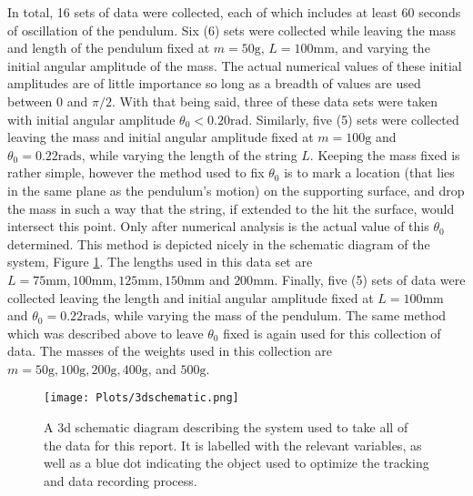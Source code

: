 In total, 16 sets of data were collected, each of which includes at least 60 seconds of oscillation of the pendulum. Six (6) sets were collected while leaving the mass and length of the pendulum fixed at $m = 50\text{g}$, $L = 100\text{mm}$, and varying the initial angular amplitude of the mass. The actual numerical values of these initial amplitudes are of little importance so long as a breadth of values are used between $0$ and $\pi/2$. With that being said, three of these data sets were taken with initial angular amplitude $\theta_0 < 0.20\text{rad}$.  Similarly, five (5) sets were collected leaving the mass and initial angular amplitude fixed at $m = 100\text{g}$ and $\theta_0 = 0.22\text{rads}$, while varying the length of the string $L$. Keeping the mass fixed is rather simple, however the method used to fix $\theta_0$ is to mark a location (that lies in the same plane as the pendulum's motion) on the supporting surface, and drop the mass in such a way that the string, if extended to the hit the surface, would intersect this point. Only after numerical analysis is the actual value of this $\theta_0$ determined. This method is depicted nicely in the schematic diagram of the system, Figure \ref{3dschematic}. The lengths used in this data set are $L = 75\text{mm}, 100\text{mm}, 125\text{mm}, 150\text{mm}$ and $200\text{mm}$. Finally, five (5) sets of data were collected leaving the length and initial angular amplitude fixed at $L = 100\text{mm}$ and $\theta_0 = 0.22\text{rads}$, while varying the mass of the pendulum. The same method which was described above to leave $\theta_0$ fixed is again used for this collection of data. The masses of the weights used in this collection are $m = 50\text{g}, 100\text{g}, 200\text{g}, 400\text{g}$, and $500\text{g}$.\\[0.20cm]

\begin{figure}[H]
\centerline{\texttt{[image: Plots/3dschematic.png]}}
\caption{\small{A 3d schematic diagram describing the system used to take all of the data for this report. It is labelled with the relevant variables, as well as a blue dot indicating the object used to optimize the tracking and data recording process.}}
\label{3dschematic}
\end{figure}

